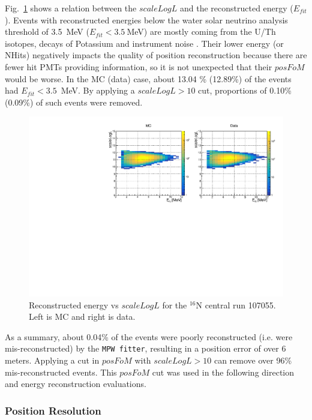 Fig.~\ref{energyVsFOM} shows a relation between the $scaleLogL$ and the reconstructed energy ($E_{fit}$). Events with reconstructed energies below the water solar neutrino analysis threshold of 3.5~MeV ($E_{fit}<3.5~$MeV) are mostly coming from the U/Th isotopes, decays of Potassium and instrument noise \cite{waterunidoc}. Their lower energy (or NHits) negatively impacts the quality of position reconstruction because there are fewer hit PMTs providing information, so it is not unexpected that their $posFoM$ would be worse. In the MC (data) case, about 13.04 \% (12.89\%) of the events had $E_{fit}<3.5$~MeV. By applying a $scaleLogL>10$ cut, proportions of 0.10\% (0.09\%) of such events were removed.

\begin{figure}[!htb]
	\centering
	\includegraphics[width=13cm]{N16_107055_scaleLogLvsEnergy.pdf}
	\caption[Reconstructed energy vs $scaleLogL$ for the $^{16}$N central run 107055.]{Reconstructed energy vs $scaleLogL$ for the $^{16}$N central run 107055. Left is MC and right is data.\label{energyVsFOM}}

\end{figure}

As a summary, about 0.04\% of the events were poorly reconstructed (i.e. were mis-reconstructed) by the \texttt{MPW fitter}, resulting in a position error of over 6 meters. Applying a cut in $posFoM$ with $scaleLogL>10$ can remove over 96\% mis-reconstructed events. This $posFoM$ cut was used in the following direction and energy reconstruction evaluations.

\subsubsection{Position Resolution}\label{sect:positionResol}

